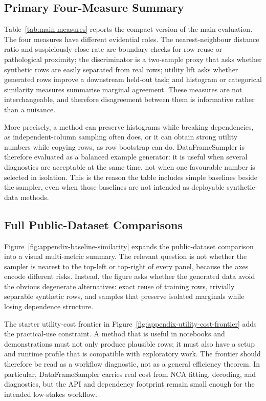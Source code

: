 \subsection{Primary Four-Measure Summary}

Table~\ref{tab:main-measures} reports the compact version of the main
evaluation. The four measures have different evidential roles. The
nearest-neighbour distance ratio and suspiciously-close rate are boundary
checks for row reuse or pathological proximity; the discriminator is a
two-sample proxy that asks whether synthetic rows are easily separated from real
rows; utility lift asks whether generated rows improve a downstream held-out
task; and histogram or categorical similarity measures summarise marginal
agreement. These measures are not interchangeable, and therefore disagreement
between them is informative rather than a nuisance.

More precisely, a method can preserve histograms while breaking dependencies,
as independent-column sampling often does, or it can obtain strong utility
numbers while copying rows, as row bootstrap can do. DataFrameSampler is
therefore evaluated as a balanced example generator: it is useful when several
diagnostics are acceptable at the same time, not when one favourable number is
selected in isolation. This is the reason the table includes simple baselines
beside the sampler, even when those baselines are not intended as deployable
synthetic-data methods.



\subsection{Full Public-Dataset Comparisons}

Figure~\ref{fig:appendix-baseline-similarity} expands the public-dataset
comparison into a visual multi-metric summary. The relevant question is not
whether the sampler is nearest to the top-left or top-right of every panel,
because the axes encode different risks. Instead, the figure asks whether the
generated data avoid the obvious degenerate alternatives: exact reuse of
training rows, trivially separable synthetic rows, and samples that preserve
isolated marginals while losing dependence structure.

The starter utility-cost frontier in
Figure~\ref{fig:appendix-utility-cost-frontier} adds the practical-use
constraint. A method that is useful in notebooks and demonstrations must not
only produce plausible rows; it must also have a setup and runtime profile that
is compatible with exploratory work. The frontier should therefore be read as a
workflow diagnostic, not as a general efficiency theorem. In particular,
DataFrameSampler carries real cost from NCA fitting, decoding, and diagnostics,
but the API and dependency footprint remain small enough for the intended
low-stakes workflow.

